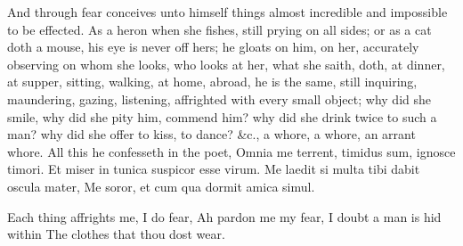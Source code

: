 {And through fear conceives unto himself things almost incredible and
impossible to be effected. As a heron when she fishes, still prying on
all sides; or as a cat doth a mouse, his eye is never off hers; he
gloats on him, on her, accurately observing on whom she looks, who
looks at her, what she saith, doth, at dinner, at supper, sitting,
walking, at home, abroad, he is the same, still inquiring, maundering,
gazing, listening, affrighted with every small object; why did she
smile, why did she pity him, commend him? why did she drink twice to
such a man? why did she offer to kiss, to dance? \&c., a whore, a whore,
an arrant whore. All this he confesseth in the poet,
Omnia me terrent, timidus sum, ignosce timori.
Et miser in tunica suspicor esse virum.
Me laedit si multa tibi dabit oscula mater,
Me soror, et cum qua dormit amica simul.

Each thing affrights me, I do fear,
Ah pardon me my fear,
I doubt a man is hid within
The clothes that thou dost wear.

}
